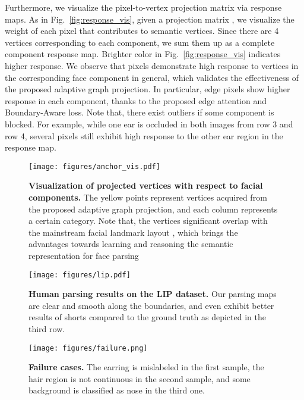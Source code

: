 Furthermore, we visualize the pixel-to-vertex projection matrix via response maps. 
As in Fig.~\ref{fig:response_vis}, given a projection matrix , we visualize the weight of each pixel that contributes to semantic vertices. Since there are 4 vertices corresponding to each component, we sum them up as a complete component response map.
Brighter color in Fig.~\ref{fig:response_vis} indicates higher response. 
We observe that pixels demonstrate high response to vertices in the corresponding face component in general, which validates the effectiveness of the proposed adaptive graph projection.   
In particular, edge pixels show higher response in each component, thanks to the proposed edge attention and Boundary-Aware loss. 
Note that, there exist outliers if some component is blocked. For example, while one ear is occluded in both images from row 3 and row 4, several pixels still exhibit high response to the other ear region in the response map.

\begin{figure}[tbp]
    \centering
    \texttt{[image: figures/anchor\_vis.pdf]}
    \caption{\textbf{Visualization of projected vertices with respect to facial components.} The yellow points represent vertices acquired from the proposed adaptive graph projection, and each column represents a certain category. Note that, the vertices significant overlap with the mainstream facial landmark layout \cite{liu2019grand, wu2018look}, which brings the advantages towards learning and reasoning the semantic representation for face parsing}
    \label{fig:anchor_vis}
\end{figure}




\begin{figure}[tbp]
    \centering
    \texttt{[image: figures/lip.pdf]}
    \caption{\textbf{Human parsing results on the LIP dataset.} Our parsing maps are clear and smooth along the boundaries, and even exhibit better results of shorts compared to the ground truth as depicted in the third row.}
    \label{fig:lip}
\end{figure}

\begin{figure}
    \centering
    \texttt{[image: figures/failure.png]}
    \caption{\textbf{Failure cases.} The earring is mislabeled in the first sample, the hair region is not continuous in the second sample, and some background is classified as nose in the third one.}
    \label{fig:failure}
\end{figure}


